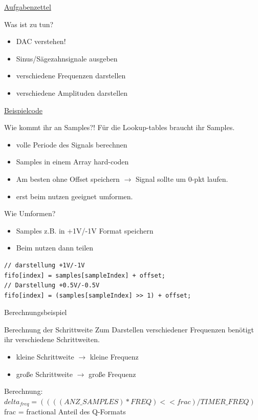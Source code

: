 \documentclass[aspectratio=169,presentation]{beamer}
\newcommand{\sectionframe}[1]{
	\begin{frame}
		\vfill
		\Huge
		\centering
		\usebeamercolor[fg]{title}
		#1
		\vfill
		\par
	\end{frame}
}
\begin{document}
\sectionframe{\href{http://users.informatik.haw-hamburg.de/~schafers/LOCAL/S19S_CE/Aufgabenzettel_Nr3_v06_Entwurf.pdf}{Aufgabenzettel}}

\begin{frame} {Was ist zu tun?}
  \begin{itemize}
    \item DAC verstehen!
    \item Sinus/Sägezahnsignale ausgeben
    \item verschiedene Frequenzen darstellen
    \item verschiedene Amplituden darstellen
  \end{itemize}
\end{frame}

\sectionframe{\href{https://users.informatik.haw-hamburg.de/~schafers/LOCAL/S19S_CE/CODE/DemoForLabA3_Curve/main.c}{Beispielcode}}

\begin{frame} {Wie kommt ihr an Samples?!}
  Für die Lookup-tables braucht ihr Samples.
  \begin{itemize}
    \item volle Periode des Signals berechnen
    \item Samples in einem Array hard-coden
    \item Am besten ohne Offset speichern $\rightarrow$ Signal sollte um 0-pkt laufen.
    \item erst beim nutzen geeignet umformen. 
  \end{itemize}
\end{frame}

\begin{frame} [fragile] {Wie Umformen?}
  \begin{itemize}
    \item Samples z.B. in +1V/-1V Format speichern
    \item Beim nutzen dann teilen
  \end{itemize}
  \begin{lstlisting}
// darstellung +1V/-1V
fifo[index] = samples[sampleIndex] + offset;
// Darstellung +0.5V/-0.5V
fifo[index] = (samples[sampleIndex] >> 1) + offset;
  \end{lstlisting}
\end{frame}

\sectionframe{Berechnungsbeispiel}

\begin{frame} {Berechnung der Schrittweite}
  Zum Darstellen verschiedener Frequenzen benötigt ihr verschiedene Schrittweiten.
  \begin{itemize}
    \item kleine Schrittweite $\rightarrow$ kleine Frequenz
    \item große Schrittweite $\rightarrow$ große Frequenz
  \end{itemize}
  \vspace{0.5cm}
  Berechnung:\\
  $delta_{freq} = ((((ANZ\_SAMPLES) * FREQ) << frac) / TIMER\_FREQ)$\\
  frac = fractional Anteil des Q-Formats
\end{frame}
\end{document}

